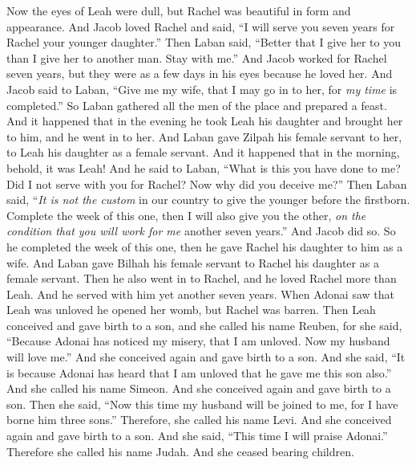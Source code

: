 \begin{biblechapter}
\verse Now the eyes of Leah were dull, but Rachel was beautiful in form and appearance.
\verse And Jacob loved Rachel and said, “I will serve you seven years for Rachel your younger daughter.”
\verse Then Laban said, “Better that I give her to you than I give her to another man. Stay with me.”
\verse And Jacob worked for Rachel seven years, but they were as a few days in his eyes because he loved her.
\verse And Jacob said to Laban, “Give me my wife, that I may go in to her, for \textit{my time} is completed.”
\verse So Laban gathered all the men of the place and prepared a feast.
\verse And it happened that in the evening he took Leah his daughter and brought her to him, and he went in to her.
\verse And Laban gave Zilpah his female servant to her, to Leah his daughter as a female servant.
\verse And it happened that in the morning, behold, it was Leah! And he said to Laban, “What is this you have done to me? Did I not serve with you for Rachel? Now why did you deceive me?”
\verse Then Laban said, “\textit{It is not the custom} in our country to give the younger before the firstborn.
\verse Complete the week of this one, then I will also give you the other, \textit{on the condition that you will work for me} another seven years.”
\verse And Jacob did so. So he completed the week of this one, then he gave Rachel his daughter to him as a wife.
\verse And Laban gave Bilhah his female servant to Rachel his daughter as a female servant.
\verse Then he also went in to Rachel, and he loved Rachel more than Leah. And he served with him yet another seven years.
 When Adonai saw that Leah was unloved he opened her womb, but Rachel was barren.
\verse Then Leah conceived and gave birth to a son, and she called his name Reuben, for she said, “Because Adonai has noticed my misery, that I am unloved. Now my husband will love me.”
\verse And she conceived again and gave birth to a son. And she said, “It is because Adonai has heard that I am unloved that he gave me this son also.” And she called his name Simeon.
\verse And she conceived again and gave birth to a son. Then she said, “Now this time my husband will be joined to me, for I have borne him three sons.” Therefore, she called his name Levi.
\verse And she conceived again and gave birth to a son. And she said, “This time I will praise Adonai.” Therefore she called his name Judah. And she ceased bearing children.
\end{biblechapter}

